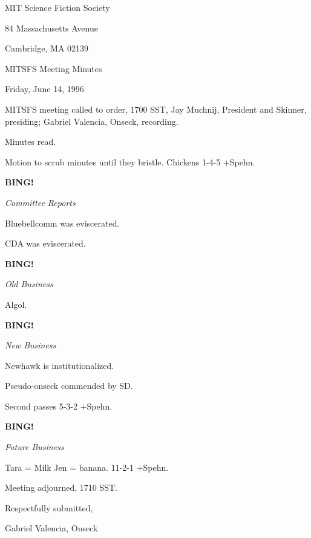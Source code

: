 \documentclass[12pt]{article}
\newcommand{\bing}{{\bf BING!} }
\newcommand{\goto}[1]{\bing \vskip 12pt \centerline{{\em{#1}}}}
\begin{document}
\begin{center}

MIT Science Fiction Society 

84 Massachusetts Avenue

Cambridge, MA 02139

\vspace{12pt}

MITSFS Meeting Minutes 

Friday, June 14, 1996

\end{center}
 
\vspace{18pt}

\setlength{\parskip}{6pt}

\noindent
MITSFS meeting called to order, 1700 SST,
Jay Muchnij, President and Skinner, presiding; Gabriel Valencia, Onseck, recording.

Minutes read.

Motion to scrub minutes until they bristle. Chickens 1-4-5 +Spehn.

\goto{Committee Reports}

Bluebellcomm was eviscerated.

CDA was eviscerated.

\goto{Old Business}

Algol.

\goto{New Business}

Newhawk is institutionalized.

Pseudo-onseck commended by SD.

Second passes 5-3-2 +Spehn.

\goto{Future Business}

Tara = Milk Jen = banana. 11-2-1 +Spehn.

\vspace{12pt}

\noindent
Meeting adjourned, 1710 SST.

\vspace{18pt}

\centerline{Respectfully submitted,}
\centerline{Gabriel Valencia, Onseck}
\end{document}
